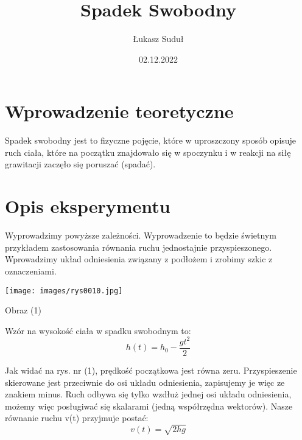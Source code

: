 \documentclass{article}
\title{Spadek Swobodny}
\author{Łukasz Suduł}
\date{02.12.2022}
\begin{document}
\maketitle

\section{Wprowadzenie teoretyczne}
    Spadek swobodny jest to fizyczne pojęcie, które w uproszczony sposób opisuje ruch ciała, które na początku znajdowało się w spoczynku i w reakcji na siłę grawitacji zaczęło się poruszać (spadać).
\section{Opis eksperymentu}
    Wyprowadzimy powyższe zależności. Wyprowadzenie to będzie świetnym przykładem zastosowania równania ruchu jednostajnie przyspieszonego. Wprowadzimy układ odniesienia związany z podłożem i zrobimy szkic z oznaczeniami.
    
\texttt{[image: images/rys0010.jpg]}
\caption{Obraz (1)}
\centering

\raggedright Wzór na wysokość ciała w spadku swobodnym to: 
\begin{equation}
h(t)=h_{0}-\frac{gt^2}{2}
\end{equation}
\raggedright
    Jak widać na rys. nr (1), prędkość początkowa jest równa zeru. Przyspieszenie skierowane jest przeciwnie do osi układu odniesienia, zapisujemy je więc ze znakiem minus. Ruch odbywa się tylko wzdłuż jednej osi układu odniesienia, możemy więc posługiwać się skalarami (jedną współrzędna wektorów). Nasze równanie ruchu v(t) przyjmuje postać:
\begin{equation}
v(t)=\sqrt{2hg}
\end{equation}
\end{document}
